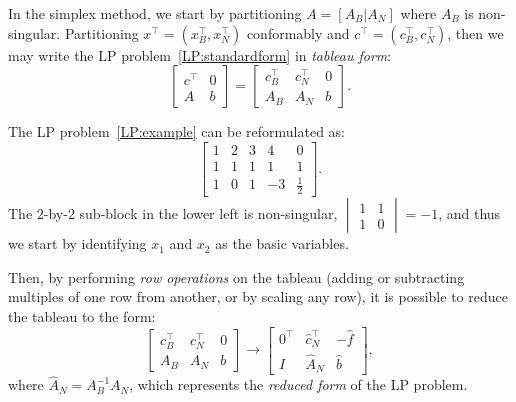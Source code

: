 In the simplex method, we start by partitioning $A = [A_B | A_N]$ where $A_B$ is non-singular. Partitioning $x^\top = (x_B^\top, x_N^\top)$ conformably and $c^\top = (c_B^\top,c_N^\top)$, then we may write the LP problem~\eqref{LP:standardform} in {\em tableau form}:
\[
\left[\begin{array}{c|c} c^\top & 0\\\hline A & b\end{array}\right] = \left[\begin{array}{cc|c} c_B^\top & c_N^\top & 0\\\hline A_B & A_N & b\end{array}\right].
\]
\begin{example}
The LP problem~\eqref{LP:example} can be reformulated as:
\[
\left[\begin{array}{cccc|c} 1 & 2 & 3 & 4 & 0\\\hline 1 & 1 & 1 & 1 & 1\\ 1 & 0 & 1 & -3 & \tfrac{1}{2}\end{array}\right].
\]
The $2$-by-$2$ sub-block in the lower left is non-singular, $\begin{vmatrix} 1 & 1\\ 1 & 0\end{vmatrix} = -1$, and thus we start by identifying $x_1$ and $x_2$ as the basic variables.
\end{example}
Then, by performing {\em row operations} on the tableau (adding or subtracting multiples of one row from another, or by scaling any row), it is possible to reduce the tableau to the form:
\[
\left[\begin{array}{cc|c} c_B^\top & c_N^\top & 0\\\hline A_B & A_N & b\end{array}\right] \rightarrow \left[\begin{array}{cc|c} 0^\top & \hat{c}_N^\top & -\hat{f}\\\hline I & \hat{A}_N & \hat{b}\end{array}\right],
\]
where $\hat{A}_N = A_B^{-1}A_N$, which represents the {\em reduced form} of the LP problem.
